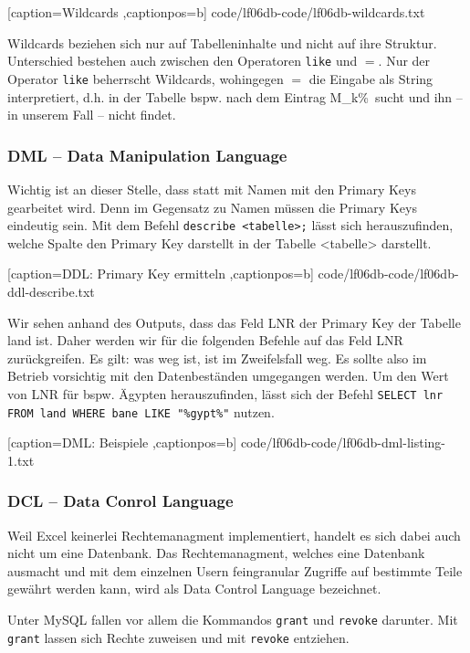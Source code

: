 
	[caption={Wildcards}
	\label{lst:wildcards},captionpos=b]
	{code/lf06db-code/lf06db-wildcards.txt}

Wildcards beziehen sich nur auf Tabelleninhalte und nicht auf ihre Struktur. Unterschied bestehen auch zwischen den Operatoren \texttt{like} und $=$. Nur der Operator \texttt{like} beherrscht Wildcards, wohingegen $=$ die Eingabe als String interpretiert, d.h. in der Tabelle bspw. nach dem Eintrag \ql M\_k\%\qr\ sucht und ihn -- in unserem Fall -- nicht findet.

\subsubsection{DML -- Data Manipulation Language}

Wichtig ist an dieser Stelle, dass statt mit Namen mit den Primary Keys gearbeitet wird. Denn im Gegensatz zu Namen müssen die Primary Keys eindeutig sein. Mit dem Befehl \texttt{describe <tabelle>;} lässt sich herauszufinden, welche Spalte den Primary Key darstellt in der Tabelle <tabelle> darstellt.


	[caption={DDL: Primary Key ermitteln}
	\label{lst:ddl-describe},captionpos=b]
	{code/lf06db-code/lf06db-ddl-describe.txt}

Wir sehen anhand des Outputs, dass das Feld LNR der Primary Key der Tabelle land ist. Daher werden wir für die folgenden Befehle auf das Feld LNR zurückgreifen. Es gilt: was weg ist, ist im Zweifelsfall weg. Es sollte also im Betrieb vorsichtig mit den Datenbeständen umgegangen werden. Um den Wert von LNR für bspw. Ägypten herauszufinden, lässt sich der Befehl \verb+SELECT lnr FROM land WHERE bane LIKE "%gypt%"+ nutzen.	


	[caption={DML: Beispiele}
	\label{lst:dml-listing-1},captionpos=b]
	{code/lf06db-code/lf06db-dml-listing-1.txt}

\subsubsection{DCL -- Data Conrol Language}
Weil Excel keinerlei Rechtemanagment implementiert, handelt es sich dabei auch nicht um eine Datenbank. Das Rechtemanagment, welches eine Datenbank ausmacht und mit dem einzelnen Usern feingranular Zugriffe auf bestimmte Teile gewährt werden kann, wird als Data Control Language bezeichnet.

Unter MySQL fallen vor allem die Kommandos \texttt{grant} und \texttt{revoke} darunter. Mit \texttt{grant} lassen sich Rechte zuweisen und mit \texttt{revoke} entziehen.

